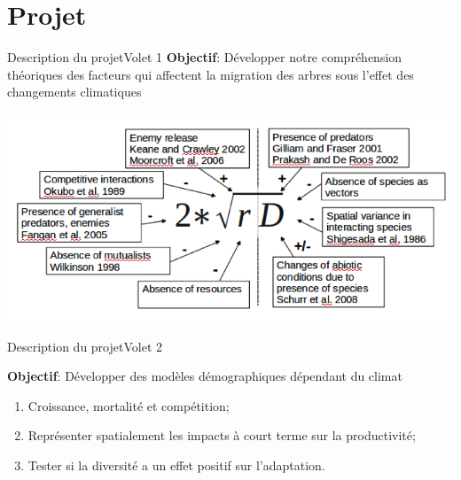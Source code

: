 \documentclass{eecslides}
\begin{document}
	\section{Projet}
	
	\begin{frame}{Description du projet}{Volet 1}
		\textbf{Objectif}: Développer notre compréhension théoriques des facteurs qui affectent la migration des arbres sous l'effet des changements climatiques

		\begin{center}
			\includegraphics[height=0.5\textheight]{svenning.png}
		\end{center}

	\end{frame}

	
	\begin{frame}{Description du projet}{Volet 2}

	\textbf{Objectif}: Développer des modèles démographiques dépendant du climat

		\begin{enumerate}
			\item Croissance, mortalité et compétition;  
			\item Représenter spatialement les impacts à court terme sur la productivité;
			\item Tester si la diversité a un effet positif sur l'adaptation. 
		\end{enumerate}
		
	\end{frame}

	
\end{document}

